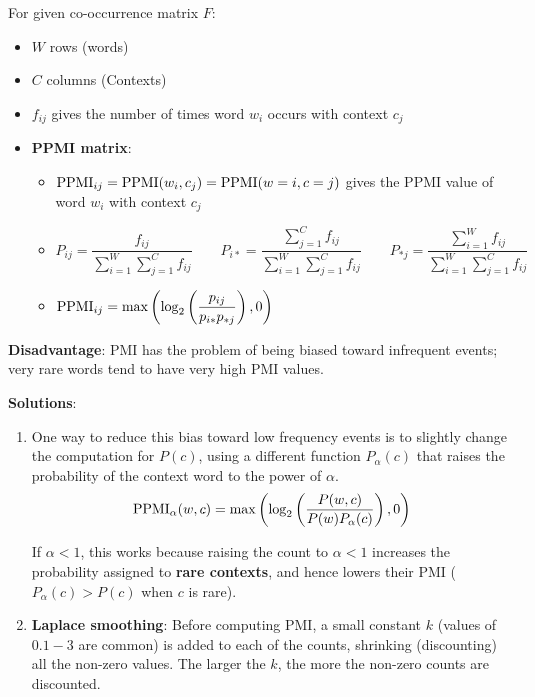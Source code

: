 For given co-occurrence matrix $F$:
\begin{itemize}
    \item $W$ rows (words)
    \item $C$ columns (Contexts)
    \item $f_{ij}$ gives the number of times word $w_i$ occurs with context $c_j$
    \item \textbf{PPMI matrix}: 
    \begin{itemize}
        \item $\operatorname{PPMI}_{ij} = \operatorname{PPMI}(w_i, c_j) = \operatorname{PPMI}(w = i, c = j)$ gives the PPMI value of word $w_i$ with context $c_j$
        
        \item \( \displaystyle P_{ij}=\dfrac{f_{ij}}{\displaystyle\sum_{i=1}^{W} \sum_{j=1}^{C} f_{ij}}  \quad\quad P_{i*}=\dfrac{\displaystyle\sum_{j=1}^{C} f_{ij}}{\displaystyle\sum_{i=1}^{W} \sum_{j=1}^{C} f_{ij}} \quad\quad P_{*j}=\dfrac{\displaystyle\sum_{i=1}^{W} f_{ij}}{\displaystyle\sum_{i=1}^{W} \sum_{j=1}^{C} f_{ij}} \)
        
        \item \( \displaystyle \operatorname{PPMI}_{ij} = \max\left( \log_2\left( \dfrac{p_{ij}}{p_{i*}p_{*j}} \right),0\right) \)
        
    \end{itemize}
\end{itemize}

\vspace{0.2cm}
\textbf{Disadvantage}: PMI has the problem of being biased toward infrequent events; very rare words tend to have very high PMI values.

\textbf{Solutions}:
\begin{enumerate}
    \item One way to reduce this bias toward low frequency events is to slightly change the computation for $P(c)$, using a different function $P_\alpha(c)$ that raises the probability of the context word to the power of $\alpha$.
    \[
        \displaystyle \operatorname{PPMI}_\alpha(w, c) = \max\left(\log_2\left(\dfrac{P(w, c)}{P(w)P_\alpha(c)}\right),0\right)
    \]    
    
    If $\alpha < 1$, this works because raising the count to $\alpha < 1$ increases the probability assigned to \textbf{rare contexts}, and hence lowers their PMI ($P_\alpha(c) > P(c)$ when $c$ is rare).

    \item \textbf{Laplace smoothing}: Before computing PMI, a small constant $k$ (values of $0.1-3$ are common) is added to each of the counts, shrinking (discounting) all the non-zero values. The larger the $k$, the more the non-zero counts are discounted.
    
\end{enumerate}

